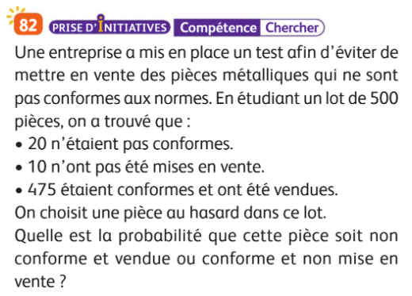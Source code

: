 \documentclass{article}
\begin{document}
\begin{center}
\begin{minipage}{0.40\textwidth}
\includegraphics[width=\textwidth]{Exercice_2.png}
\end{minipage}

\end{center}
\end{document}
